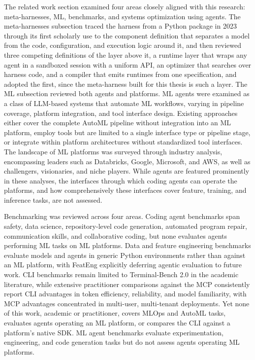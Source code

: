 \documentclass[
english,                 %
bibtex,                  %
]{kththesis}
\numberwithin{listing}{chapter}
\begin{document}
The related work section examined four areas closely aligned with this research: meta-harnesses, \gls{ML}, benchmarks, and systems optimization using agents. The meta-harnesses subsection traced the harness from a Python package in 2023 through its first scholarly use to the component definition that separates a model from the code, configuration, and execution logic around it, and then reviewed three competing definitions of the layer above it, a runtime layer that wraps any agent in a sandboxed session with a uniform \gls{API}, an optimizer that searches over harness code, and a compiler that emits runtimes from one specification, and adopted the first, since the meta-harness built for this thesis is such a layer. The \gls{ML} subsection reviewed both agents and platforms. \Gls{ML} agents were examined as a class of \gls{LLM}-based systems that automate \gls{ML} workflows, varying in pipeline coverage, platform integration, and tool interface design. Existing approaches either cover the complete \gls{AutoML} pipeline without integration into an \gls{ML} platform, employ tools but are limited to a single interface type or pipeline stage, or integrate within platform architectures without standardized tool interfaces. The landscape of \gls{ML} platforms was surveyed through industry analysis, encompassing leaders such as Databricks, Google, Microsoft, and \gls{AWS}, as well as challengers, visionaries, and niche players. While agents are featured prominently in these analyses, the interfaces through which coding agents can operate the platforms, and how comprehensively these interfaces cover feature, training, and inference tasks, are not assessed.

Benchmarking was reviewed across four areas. Coding agent benchmarks span safety, data science, repository-level code generation, automated program repair, communication skills, and collaborative coding, but none evaluates agents performing \gls{ML} tasks on \gls{ML} platforms. Data and feature engineering benchmarks evaluate models and agents in generic Python environments rather than against an \gls{ML} platform, with \gls{FeatEng} explicitly deferring agentic evaluation to future work. \Gls{CLI} benchmarks remain limited to Terminal-Bench 2.0 in the academic literature, while extensive practitioner comparisons against the \gls{MCP} consistently report \gls{CLI} advantages in token efficiency, reliability, and model familiarity, with \gls{MCP} advantages concentrated in multi-user, multi-tenant deployments. Yet none of this work, academic or practitioner, covers \gls{MLOps} and \gls{AutoML} tasks, evaluates agents operating an \gls{ML} platform, or compares the \gls{CLI} against a platform's native \gls{SDK}. \Gls{ML} agent benchmarks evaluate experimentation, engineering, and code generation tasks but do not assess agents operating \gls{ML} platforms.
\end{document}
